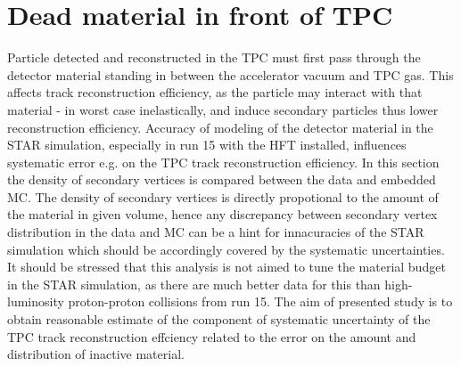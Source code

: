 

\newcommand{\itemm}{\item\hspace*{-5pt}.\hspace*{-1pt}~}

\chapter{Dead material in front of TPC}\label{chap:deadMaterial}

Particle detected and reconstructed in the TPC must first pass through the detector material standing in between the accelerator vacuum and TPC gas. This affects track reconstruction efficiency, as the particle may interact with that material - in worst case inelastically, and induce secondary particles thus lower reconstruction efficiency. Accuracy of modeling of the detector material in the STAR simulation, especially in run 15 with the HFT installed, influences systematic error e.g. on the TPC track reconstruction efficiency. In this section the density of secondary vertices is compared between the data and embedded MC. The density of secondary vertices is directly propotional to the amount of the material in given volume, hence any discrepancy between secondary vertex distribution in the data and MC can be a hint for innacuracies of the STAR simulation which should be accordingly covered by the systematic uncertainties. It should be stressed that this analysis is not aimed to tune the material budget in the STAR simulation, as there are much better data for this than high-luminosity proton-proton collisions from run 15. The aim of presented study is to obtain reasonable estimate of the component of systematic uncertainty of the TPC track reconstruction effciency related to the error on the amount and distribution of inactive material.

